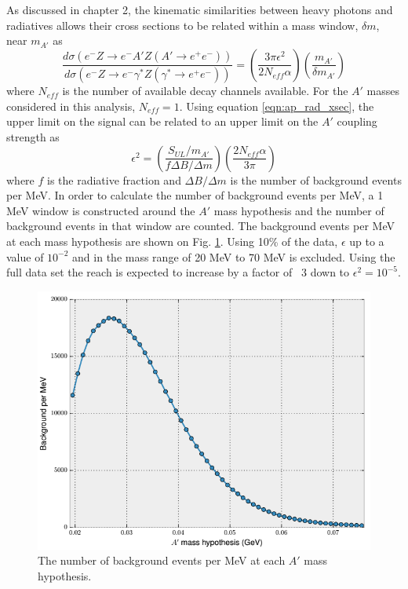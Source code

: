 As discussed in chapter 2, the kinematic similarities between heavy photons and 
radiatives allows their cross sections to be related within a mass window, 
$\delta m$, near $m_{A'}$ as 
\begin{equation}
    \frac{d\sigma(e^-Z \rightarrow e^-A'Z(A' \rightarrow e^+e^-))}{
    d\sigma(e^-Z \rightarrow e^-\gamma^*Z(\gamma^* \rightarrow e^+e^-))} = 
    \left( \frac{3 \pi \epsilon^2}{2 N_{eff} \alpha} \right)
        \left( \frac{m_{A'}}{\delta m_{A'}} \right)
    \label{eqn:ap_rad_xsec}
\end{equation}
where $N_{eff}$ is the number of available decay channels available.  For the 
$A'$ masses considered in this analysis, $N_{eff} = 1$. Using equation 
\ref{eqn:ap_rad_xsec}, the upper limit on the signal can be related to an
upper limit on the $A'$ coupling strength as 
\begin{equation}
    \epsilon^2 = \left (\frac{S_{UL}/m_{A'}}{
                f\Delta B/\Delta m} \right) 
                \left(\frac{2 N_{eff} \alpha}{3 \pi} \right)
    \label{eqn:eps}
\end{equation}
where $f$ is the radiative fraction and $\Delta B/\Delta m$ is the number of 
background events per MeV.  In order to calculate the number of background 
events per MeV, a 1 MeV window is constructed around the $A'$ mass hypothesis
and the number of background events in that window are counted.  The 
background events per MeV at each mass hypothesis are shown on Fig. 
\ref{fig:background_mev}.  Using
10\% of the data, $\epsilon$ up to a value of $10^{-2}$ and in the mass range 
of 20 MeV to 70 MeV is excluded.  Using the full data set
the reach is expected to increase by a factor of ~3 down to $\epsilon^2 = 10^{-5}$. 
\begin{figure}[t]
    \centering
    \includegraphics[width=.8\textwidth]{images/bkg_mev.png}
    \caption{The number of background events per MeV at each $A'$ mass hypothesis.}
    \label{fig:background_mev}
\end{figure}
